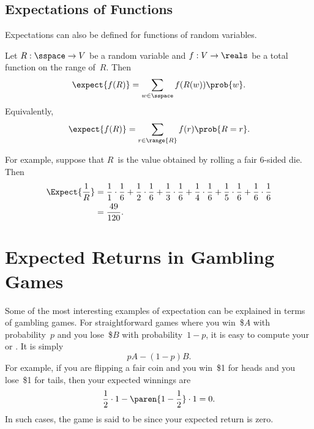 \subsection{Expectations of Functions}

Expectations can also be defined for functions of random variables.

\begin{definition}\label{def:exp_func}
Let $R: \sspace \to V$ be a random variable and $f: V \to \reals$ be a
total function on the range of~$R$.  Then
\begin{equation}\label{eqn:17P8}
    \expect{f(R)} = \sum_{w \in \sspace} f(R(w)) \prob{w}.
\end{equation}
Equivalently,
\begin{equation}\label{eqn:17P9}
    \expect{f(R)} = \sum_{r \in \range{R}} f(r) \prob{R = r}.
\end{equation}
\end{definition}

For example, suppose that $R$~is the value obtained by rolling a fair
6-sided die.  Then
\begin{align*}
\Expect{\frac{1}{R}}
    &= \frac{1}{1} \cdot \frac{1}{6}
     + \frac{1}{2} \cdot \frac{1}{6}
     + \frac{1}{3} \cdot \frac{1}{6}
     + \frac{1}{4} \cdot \frac{1}{6}
     + \frac{1}{5} \cdot \frac{1}{6}
     + \frac{1}{6} \cdot \frac{1}{6} \\
    &= \frac{49}{120}.
\end{align*}

\section{Expected Returns in Gambling Games}

Some of the most interesting examples of expectation can be explained
in terms of gambling games.  For straightforward games where you
win~\$$A$ with probability~$p$ and you lose~\$$B$ with probability~$1 -
p$, it is easy to compute your  or
.  It is simply
\begin{equation*}
    p A - (1 - p) B.
\end{equation*}
For example, if you are flipping a fair coin and you win~\$1 for heads
and you lose~\$1 for tails, then your expected winnings are
\begin{equation*}
    \frac{1}{2} \cdot 1 - \paren{1 - \frac{1}{2}} \cdot 1 = 0.
\end{equation*}
In such cases, the game is said to be  since your expected
return is zero.

